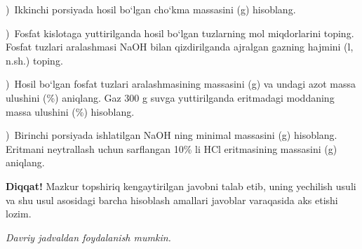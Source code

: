 \documentclass[11pt,a4paper]{article}
\newcommand{\qsep}{\par\vspace{13pt}}
\newcommand{\diqqat}[1]{\par\smallskip\noindent\textbf{Diqqat!} #1\par\medskip}
\newcommand{\hdrpill}[1]{\begin{tikzpicture}[baseline=0pt]\node[fill=ygreen,text=white,rounded corners=8pt,inner xsep=10pt,inner ysep=5pt,font=\fontsize{13}{15}\bfseries\selectfont] at (0,0.475){#1};\end{tikzpicture}}
\newcommand{\curvar}{}\fancyhead[R]{\hdrpill{\curvar}}
\begin{document}
)\ Ikkinchi porsiyada hosil bo`lgan cho`kma massasini (g) hisoblang.\par
{})\ Fosfat kislotaga yuttirilganda hosil bo`lgan tuzlarning mol miqdorlarini toping. Fosfat tuzlari aralashmasi NaOH bilan qizdirilganda ajralgan gazning hajmini (l, n.sh.) toping.\par
{})\ Hosil bo`lgan fosfat tuzlari aralashmasining massasini (g) va undagi azot massa ulushini (\%) aniqlang. Gaz 300 g suvga yuttirilganda eritmadagi moddaning massa ulushini (\%) hisoblang.\par
{})\ Birinchi porsiyada ishlatilgan NaOH ning minimal massasini (g) hisoblang. Eritmani neytrallash uchun sarflangan 10\% li HCl eritmasining massasini (g) aniqlang.\par
\diqqat{Mazkur topshiriq kengaytirilgan javobni talab etib, uning yechilish usuli va shu usul asosidagi barcha hisoblash amallari javoblar varaqasida aks etishi lozim.}\qsep
\newpage
\renewcommand{\curvar}{15-variant}
\thispagestyle{first}
\noindent\textit{Davriy jadvaldan foydalanish mumkin.}
\par\smallskip
\end{document}

